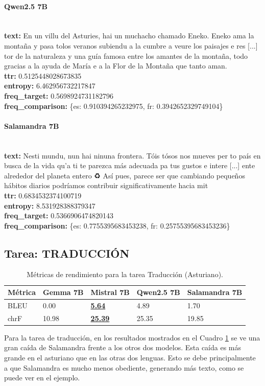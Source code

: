 \paragraph{Qwen2.5 7B}~\\
\textbf{text:} En un villu del Asturies, hai un muchacho chamado Eneko. Eneko ama la montaña y pasa tolos veranos subiendu a la cumbre a veure los paisajes e res [...] tor de la naturaleza y una guía famosa entre los amantes de la montaña, todo gracias a la ayuda de María e a la Flor de la Montaña que tanto aman.\\
\textbf{ttr:} 0.5125448028673835\\
\textbf{entropy:} 6.462956732217847\\
\textbf{freq\_target:} 0.5698924731182796\\
\textbf{freq\_comparison:} \{\textquotesingle{}es\textquotesingle{}: 0.910394265232975, \textquotesingle{}fr\textquotesingle{}: 0.3942652329749104\}

\paragraph{Salamandra 7B}~\\
\textbf{text:} Nesti mundu, nun hai ninuna frontera. Tóis tósos nos mueves per to país en busca de la vida qu’a ti te parezca más adecuada pa tus gustos e intere [...] ente alrededor del planeta entero ♻️ Así pues, parece ser que cambiando pequeños hábitos diarios podríamos contribuir significativamente hacia mit\\
\textbf{ttr:} 0.6834532374100719\\
\textbf{entropy:} 8.531928388379347\\
\textbf{freq\_target:} 0.5366906474820143\\
\textbf{freq\_comparison:} \{\textquotesingle{}es\textquotesingle{}: 0.7755395683453238, \textquotesingle{}fr\textquotesingle{}: 0.25755395683453236\}

\subsection{Tarea: TRADUCCIÓN}\label{tarea-traduccion}
\begin{longtable}{@{}lllll@{}}
\toprule\noalign{}
Métrica & Gemma 7B & Mistral 7B & Qwen2.5 7B & Salamandra 7B \\
\midrule\noalign{}
\endhead
\bottomrule\noalign{}
\caption{Métricas de rendimiento para la tarea Traducción (Asturiano).} 
\label{tab:metricas_traduccion_Asturiano}
\endlastfoot
BLEU & 0.00 & \textbf{\underline{5.64}} & 4.89 & 1.70 \\
chrF & 10.98 & \textbf{\underline{25.39}} & 25.35 & 19.85 \\
\end{longtable}
Para la tarea de traducción, en los resultados mostrados en el Cuadro \ref{tab:metricas_traduccion_Asturiano} se ve una gran caída de Salamandra frente a los otros dos modelos. Esta caída es más grande en el asturiano que en las otras dos lenguas. Esto se debe principalmente a que Salamandra es mucho menos obediente, generando más texto, como se puede ver en el ejemplo. 

